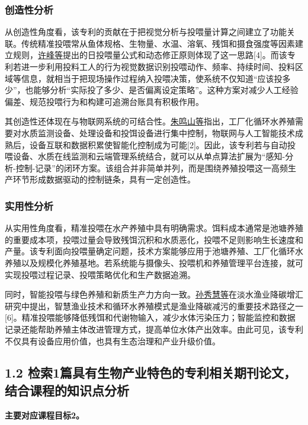 \documentclass[UTF8,zihao=-4]{ctexart}
\begin{document}
	\subsubsection*{创造性分析}
	从创造性角度看，该专利的贡献在于把视觉分析与投喂量计算之间建立了功能关联。传统精准投喂常从鱼体规格、生物量、水温、溶氧、残饵和摄食强度等因素建立规则，\href{https://kns.cnki.net/}{许峰等}提出的日投喂量公式和动态修正原则体现了这一思路[4]。而该专利若进一步利用投料工人的行为视觉数据识别投喂动作、频率、持续时间、投料区域等信息，就相当于把现场操作过程纳入投喂决策，使系统不仅知道“应该投多少”，也能够分析“实际投了多少、是否偏离设定策略”。这种方案对减少人工经验偏差、规范投喂行为和构建可追溯台账具有积极作用。
	
	其创造性还体现在与物联网系统的可结合性。\href{https://kns.cnki.net/}{朱鸣山等}指出，工厂化循环水养殖需要对水质监测设备、处理设备和投饵设备进行集中控制，物联网与人工智能技术成熟后，设备互联和数据积累使智能化控制成为可能[2]。因此，该专利若与自动投喂设备、水质在线监测和云端管理系统结合，就可以从单点算法扩展为“感知-分析-控制-记录”的闭环方案。该组合并非简单并列，而是围绕养殖投喂这一高频生产环节形成数据驱动的控制链条，具有一定创造性。
	
	\subsubsection*{实用性分析}
	从实用性角度看，精准投喂在水产养殖中具有明确需求。饵料成本通常是池塘养殖的重要成本项，投喂过量会导致残饵沉积和水质恶化，投喂不足则影响生长速度和产量。该专利面向投喂量确定问题，技术方案能够应用于池塘养殖、工厂化循环水养殖以及规模化养殖基地。若系统能与摄像头、投喂机和养殖管理平台连接，就可实现投喂过程记录、投喂策略优化和生产数据追溯。
	
	同时，智能投喂与绿色养殖和新质生产力方向一致。\href{https://kns.cnki.net/}{孙秀慧等}在淡水渔业降碳增汇研究中提出，智慧渔业技术和循环水养殖模式是渔业降碳减污的重要技术路径之一[6]。精准投喂能够降低残饵和代谢物输入，减少水体污染压力；智能监控和数据记录还能帮助养殖主体改进管理方式，提高单位水体产出效率。由此可见，该专利不仅具有设备应用价值，也具有生态治理和产业升级价值。
	
	\subsection*{1.2 检索1篇具有生物产业特色的专利相关期刊论文，结合课程的知识点分析}
	
	\noindent\textbf{主要对应课程目标2。}
	
\end{document}
